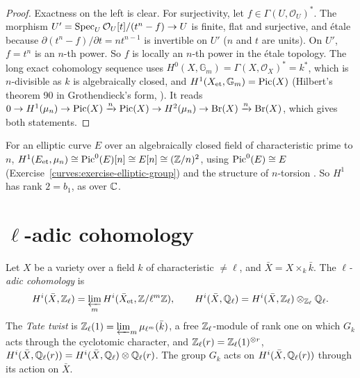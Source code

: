 \begin{proof}
Exactness on the left is clear. For surjectivity, let $f \in \Gamma(U, \mathcal{O}_U)^*$. The morphism $U' = \operatorname{Spec}_U\mathcal{O}_U[t]/(t^n - f) \to U$ is finite, flat and surjective, and
\'etale because $\partial(t^n - f)/\partial t = nt^{n-1}$ is invertible on $U'$ ($n$ and $t$ are units). On $U'$, $f = t^n$ is an $n$-th power. So $f$ is locally an $n$-th power in the \'etale
topology. The long exact cohomology sequence uses $H^0(X, \mathbb{G}_m) = \Gamma(X, \mathcal{O}_X)^* = k^*$, which is $n$-divisible as $k$ is algebraically closed, and
$H^1(X_{\mathrm{et}}, \mathbb{G}_m) = \operatorname{Pic}(X)$ (Hilbert's theorem 90 in Grothendieck's form, \cite[Chapter III]{milne-etale}). It reads
$0 \to H^1(\mu_n) \to \operatorname{Pic}(X) \xrightarrow{n} \operatorname{Pic}(X) \to H^2(\mu_n) \to \mathrm{Br}(X) \xrightarrow{n} \mathrm{Br}(X)$, which gives both statements.
\end{proof}

\begin{example}\label{etale-cohomology:example-kummer}
For an elliptic curve $E$ over an algebraically closed field of characteristic prime to $n$, $H^1(E_{\mathrm{et}}, \mu_n) \cong \operatorname{Pic}^0(E)[n] \cong E[n] \cong (\mathbb{Z}/n)^2$, using $\operatorname{Pic}^0(E) \cong E$
(Exercise~\ref{curves:exercise-elliptic-group}) and the structure of $n$-torsion \cite{mumford-abelian}. So $H^1$ has rank $2 = b_1$, as over $\mathbb{C}$.
\end{example}

\section{$\ell$-adic cohomology}\label{etale-cohomology:section-l-adic}

\begin{definition}\label{etale-cohomology:definition-l-adic}
Let $X$ be a variety over a field $k$ of characteristic $\neq \ell$, and $\bar X = X \times_k\bar k$. The \emph{$\ell$-adic cohomology} is
\[
H^i(\bar X, \mathbb{Z}_\ell) = \varprojlim_mH^i(\bar X_{\mathrm{et}}, \mathbb{Z}/\ell^m\mathbb{Z}), \qquad H^i(\bar X, \mathbb{Q}_\ell) = H^i(\bar X, \mathbb{Z}_\ell) \otimes_{\mathbb{Z}_\ell}\mathbb{Q}_\ell .
\]
The \emph{Tate twist} is $\mathbb{Z}_\ell(1) = \varprojlim_m\mu_{\ell^m}(\bar k)$, a free $\mathbb{Z}_\ell$-module of rank one on which $G_k$ acts through the cyclotomic character, and
$\mathbb{Z}_\ell(r) = \mathbb{Z}_\ell(1)^{\otimes r}$, $H^i(\bar X, \mathbb{Q}_\ell(r)) = H^i(\bar X, \mathbb{Q}_\ell) \otimes \mathbb{Q}_\ell(r)$. The group $G_k$ acts on $H^i(\bar X, \mathbb{Q}_\ell(r))$ through its action on $\bar X$.
\end{definition}

